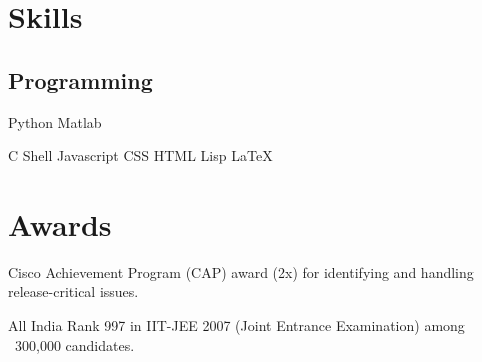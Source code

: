 \documentclass[]{deedy-resume-openfont}
\begin{document}

\section{Skills}
\begin{minipage}[t]{.9\textwidth}
\subsection{Programming}
\begin{minipage}[t]{.2\textwidth}
\textbullet{} Python \textbullet{} Matlab \textbullet{} 
\end{minipage}
\hfill
\begin{minipage}[t]{.7\textwidth}
\textbullet{} C \textbullet{} Shell \textbullet{} Javascript \textbullet{} CSS \textbullet{} HTML \textbullet{} Lisp \textbullet{} \LaTeX\ \textbullet{}
\end{minipage}
\sectionsep
\end{minipage}


\section{Awards}
\vspace{\topsep} %
\begin{tightemize}
\item Cisco Achievement Program (CAP) award (2x) for identifying and handling release-critical issues.
\item All India Rank 997 in IIT-JEE 2007 (Joint Entrance Examination) among ~300,000 candidates.
\end{tightemize}
\sectionsep
\end{document}
